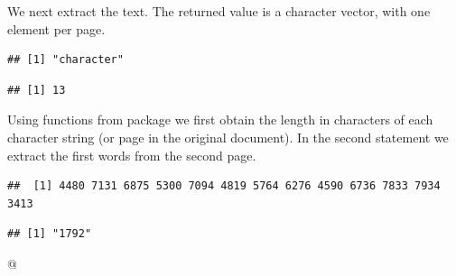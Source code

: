 \documentclass[krantz2,ChapterTOCs]{krantz}\usepackage{knitr}
\begin{document}
We next extract the text. The returned value is a character vector, with one element per page.

\begin{knitrout}\footnotesize
{}\color{fgcolor}\begin{kframe}
\begin{alltt}
 \hlkwb{<-} \hlstd{(}\hlstd{)}
\end{alltt}
\begin{verbatim}
## [1] "character"
\end{verbatim}
\begin{alltt}
\end{alltt}
\begin{verbatim}
## [1] 13
\end{verbatim}
\end{kframe}
\end{knitrout}

Using functions from package  we first obtain the length in characters of each character string (or page in the original document). In the second statement we extract the first words from the second page.

\begin{knitrout}\footnotesize
{}\color{fgcolor}\begin{kframe}
\begin{alltt}
\hlopt{::}
\end{alltt}
\begin{verbatim}
##  [1] 4480 7131 6875 5300 7094 4819 5764 6276 4590 6736 7833 7934 3413
\end{verbatim}
\begin{alltt}
\hlopt{::}\hlstd{(my.text[}\hlstd{])}
\end{alltt}
\begin{verbatim}
## [1] "1792"
\end{verbatim}
\end{kframe}
\end{knitrout}

@
\subsubsection[tabulizer]{}
\end{document}

